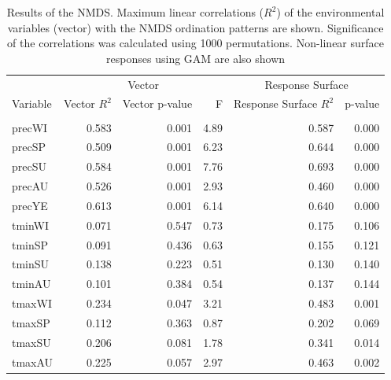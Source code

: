 \begin{table}[]
\caption{Results of the NMDS. Maximum linear correlations ($R^2$) of the environmental variables (vector) with the NMDS ordination patterns are shown. Significance of the correlations was calculated using 1000 permutations. Non-linear surface responses using GAM are also shown}\label{tab:tnmds}
\centering\begingroup\fontsize{8}{10}\selectfont
\begin{tabular}{lrrrrr}
\toprule
\multicolumn{1}{c}{ } & \multicolumn{3}{c}{Vector} & \multicolumn{2}{c}{Response Surface} \\
\cmidrule(l{3pt}r{3pt}){2-4} \cmidrule(l{3pt}r{3pt}){5-6}
Variable & Vector $R^2$ & Vector p-value & F & Response Surface $R^2$ & p-value\\
\midrule
\addlinespace[0.3em]
\multicolumn{6}{l}{\textbf{Climate}}\\
\hspace{1em}precWI & 0.583 & 0.001 & 4.89 & 0.587 & 0.000\\
\hspace{1em}precSP & 0.509 & 0.001 & 6.23 & 0.644 & 0.000\\
\hspace{1em}precSU & 0.584 & 0.001 & 7.76 & 0.693 & 0.000\\
\hspace{1em}precAU & 0.526 & 0.001 & 2.93 & 0.460 & 0.000\\
\hspace{1em}precYE & 0.613 & 0.001 & 6.14 & 0.640 & 0.000\\
\hspace{1em}tminWI & 0.071 & 0.547 & 0.73 & 0.175 & 0.106\\
\hspace{1em}tminSP & 0.091 & 0.436 & 0.63 & 0.155 & 0.121\\
\hspace{1em}tminSU & 0.138 & 0.223 & 0.51 & 0.130 & 0.140\\
\hspace{1em}tminAU & 0.101 & 0.384 & 0.54 & 0.137 & 0.144\\
\hspace{1em}tmaxWI & 0.234 & 0.047 & 3.21 & 0.483 & 0.001\\
\hspace{1em}tmaxSP & 0.112 & 0.363 & 0.87 & 0.202 & 0.069\\
\hspace{1em}tmaxSU & 0.206 & 0.081 & 1.78 & 0.341 & 0.014\\
\hspace{1em}tmaxAU & 0.225 & 0.057 & 2.97 & 0.463 & 0.002\\

\end{tabular}
\end{table}

